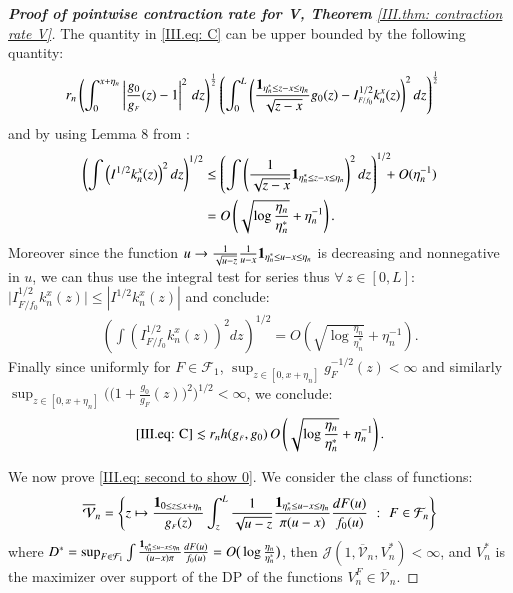 \begin{proof}[\hypertarget{III.proof contraction pointwise V}{\textbf{Proof of pointwise contraction rate for V, Theorem} \ref{III.thm: contraction rate V}}]
    The quantity in \eqref{III.eq: C} can be upper bounded by the following quantity:
    \begin{align*}
        &r_n \left( \int_0^{x+\eta_n} \left| \frac{g_0}{g_{\scriptscriptstyle{F}}}(z) - 1 \right|^2 \, dz \right)^{\frac{1}{2}} \left( \int_0^L \left( \frac{\mathbf{1}_{\eta^*_n \leq z - x \leq \eta_n}}{\sqrt{z-x}} g_0(z) - I_{\scriptscriptstyle{F/f_0}}^{1/2} k_n^x(z) \right)^2 dz \right)^{\frac{1}{2}} 
    \end{align*}
    and by using Lemma 8 from \cite{27}:
    \begin{align*}
    \left( \int \left( I^{1/2} k_n^x(z) \right)^2 dz \right)^{1/2} &\leq \left( \int \left( \frac{1}{\sqrt{z-x}} \ind_{\eta^*_n \leq z - x \leq \eta_n} \right)^2 dz \right)^{1/2} \hspace{-0.2cm} + O(\eta_n^{-1}) \\
    &= O \left( \sqrt{\log \frac{\eta_n}{\eta^*_n}} + \eta_n^{-1} \right).
    \end{align*}
    Moreover since the function $u \rightarrow \frac{1}{\sqrt{u-z}} \frac{1}{u-x} \mathbf{1}_{\eta^*_n \leq u - x \leq \eta_n}$ is decreasing and nonnegative in $u$, we can thus use the integral test for series thus $\forall \, z \in [0,L]$: $\big| I_{\scriptscriptstyle{F/f_0}}^{1/2} k_n^x(z) \big| \leq \left| I^{1/2} k_n^x(z) \right|$ and conclude:
    \begin{align*}
        \left( \int \left( I_{\scriptscriptstyle{F/f_0}}^{1/2} k_n^x(z) \right)^2 dz \right)^{1/2} = O \left( \sqrt{\log \frac{\eta_n}{\eta^*_n}} + \eta_n^{-1} \right).
    \end{align*}    
    Finally since uniformly for $F \in \mathcal{F}_1$, $\sup_{z \in [0, x+\eta_n]} g^{-1/2}_{\scriptscriptstyle{F}}(z) < \infty$ and similarly $\sup_{z \in [0, x+\eta_n]} \big( \big( 1 + \frac{g_0}{g_{\scriptscriptstyle{F}}} (z)  \big)^2 \big)^{1/2} < \infty$, we conclude:
    \begin{align*}
        \eqref{III.eq: C} \lesssim r_n  h(g_{\scriptscriptstyle{F}}, g_0) \, O \left( \sqrt{\log \frac{\eta_n}{\eta^*_n}} +\eta_n^{-1} \right). 
    \end{align*}

    We now prove \eqref{III.eq: second to show 0}. We consider the class of functions:
    \begin{align*}
        \overline{\mathcal{V}}_n = \left\{ z \mapsto \frac{\mathbf{1}_{0 \leq z \leq x + \eta_n}}{g_{\scriptscriptstyle{F}}(z)} \int_z^L \frac{1}{\sqrt{u-z}}  \frac{\mathbf{1}_{\eta_n^* \leq u - x \leq \eta_n}}{\pi (u-x)}  \frac{dF(u)}{f_0(u)} \, \, : \, \, F \in \mathcal{F}_n \right\}
    \end{align*}
    where $D^* = \sup_{F \in \mathcal{F}_1} \int \frac{\mathbf{1}_{\eta_n^* \leq u - x \leq \eta_n}}{(u-x) \pi} \frac{dF(u)}{f_0(u)}  = O \big( \log \frac{\eta_n}{\eta_n^*} \big)$, then $\mathcal{J} (1, \overline{\mathcal{V}}_n, V_n^*) < \infty$, and $V_n^{*}$ is the maximizer over support of the DP of the functions $V_n^{\scriptscriptstyle{F}} \in \overline{\mathcal{V}}_n$.
    

\end{proof}
